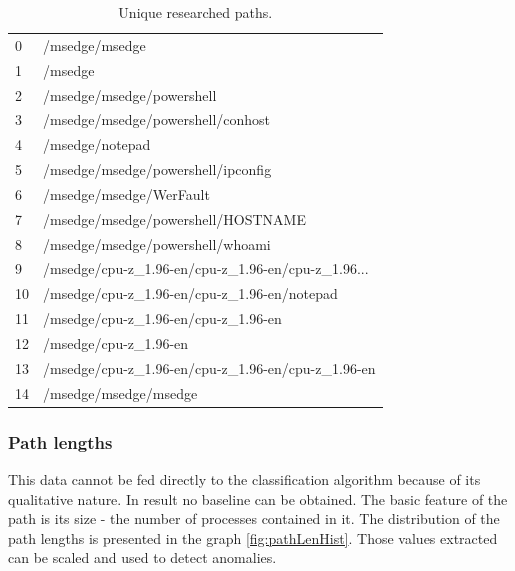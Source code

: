 \documentclass[a4paper,twoside,12pt]{book}
\begin{document}
\begin{table}
	\centering
	\caption{Unique researched paths.}
	\label{id:tab:uniqPaths}
	\begin{tabular}{ll}
		\toprule
		0  &                                     /msedge/msedge \\
		1  &                                            /msedge \\
		2  &                          /msedge/msedge/powershell \\
		3  &                  /msedge/msedge/powershell/conhost \\
		4  &                                    /msedge/notepad \\
		5  &                 /msedge/msedge/powershell/ipconfig \\
		6  &                            /msedge/msedge/WerFault \\
		7  &                 /msedge/msedge/powershell/HOSTNAME \\
		8  &                   /msedge/msedge/powershell/whoami \\
		9  &  /msedge/cpu-z\_1.96-en/cpu-z\_1.96-en/cpu-z\_1.96... \\
		10 &        /msedge/cpu-z\_1.96-en/cpu-z\_1.96-en/notepad \\
		11 &                /msedge/cpu-z\_1.96-en/cpu-z\_1.96-en \\
		12 &                              /msedge/cpu-z\_1.96-en \\
		13 &  /msedge/cpu-z\_1.96-en/cpu-z\_1.96-en/cpu-z\_1.96-en \\
		14 &                              /msedge/msedge/msedge \\
		\bottomrule
	\end{tabular}
\end{table}

\subsubsection{Path lengths}

This data cannot be fed directly to the classification algorithm because of its 
qualitative nature. In result no baseline can be obtained. The basic feature
of the path is its size - the number of processes contained in it. The distribution
of the path lengths is presented in the graph \ref{fig:pathLenHist}. Those values
extracted can be scaled and used to detect anomalies.
\end{document}
